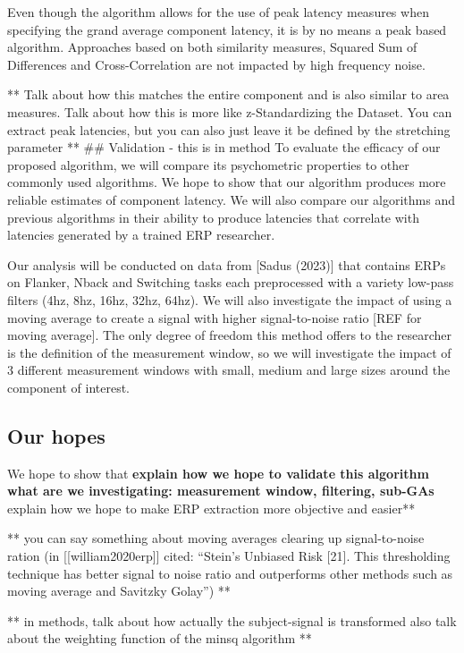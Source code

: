 \documentclass[
  man,floatsintext]{apa7}
\begin{document}
Even though the algorithm allows for the use of peak latency measures when specifying the grand average component latency, it is by no means a peak based algorithm. Approaches based on both similarity measures, Squared Sum of Differences and Cross-Correlation are not impacted by high frequency noise.

** Talk about how this matches the entire component and is also similar to area measures. \textbf{
} Talk about how this is more like z-Standardizing the Dataset. You can extract peak latencies, but you can also just leave it be defined by the stretching parameter **
\#\# Validation - this is in method
To evaluate the efficacy of our proposed algorithm, we will compare its psychometric properties to other commonly used algorithms. We hope to show that our algorithm produces more reliable estimates of component latency. We will also compare our algorithms and previous algorithms in their ability to produce latencies that correlate with latencies generated by a trained ERP researcher.

Our analysis will be conducted on data from {[}Sadus (2023){]} that contains ERPs on Flanker, Nback and Switching tasks each preprocessed with a variety low-pass filters (4hz, 8hz, 16hz, 32hz, 64hz). We will also investigate the impact of using a moving average to create a signal with higher signal-to-noise ratio {[}REF for moving average{]}. The only degree of freedom this method offers to the researcher is the definition of the measurement window, so we will investigate the impact of 3 different measurement windows with small, medium and large sizes around the component of interest.

\hypertarget{our-hopes}{%
\subsection{Our hopes}\label{our-hopes}}

We hope to show that
\textbf{explain how we hope to validate this algorithm}
\textbf{what are we investigating: measurement window, filtering, sub-GAs
}explain how we hope to make ERP extraction more objective and easier**

** you can say something about moving averages clearing up signal-to-noise ration (in {[}{[}william2020erp{]}{]} cited: ``Stein's Unbiased Risk {[}21{]}. This thresholding technique has better signal to noise ratio and outperforms other methods such as moving average and Savitzky Golay'') **

** in methods, talk about how actually the subject-signal is transformed \textbf{
} also talk about the weighting function of the minsq algorithm **
\end{document}
